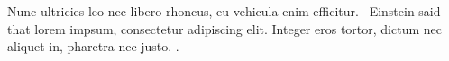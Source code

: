 \documentclass{article}
\begin{document}
\cite{Einstein1920}
Nunc ultricies leo nec libero rhoncus, eu vehicula enim efficitur.~\cite{Darwin1888}
Einstein said~\cite{Einstein1920} that lorem impsum, consectetur adipiscing elit. Integer eros tortor, dictum nec aliquet in, pharetra nec justo.
\cite{Darwin1888}.




\end{document}
